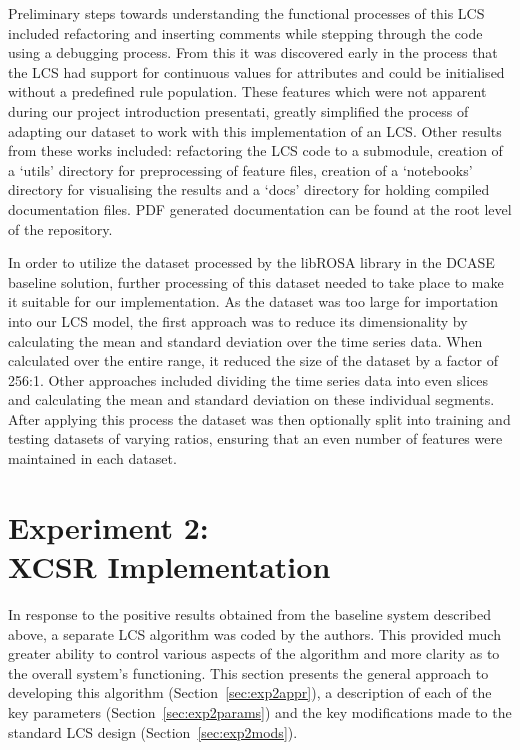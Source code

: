 \documentclass[11pt]{article}
\begin{document}
\begin{multicols}{2}
Preliminary steps towards understanding the functional processes of this LCS included refactoring and inserting comments while stepping through the code using a debugging process. From this it was discovered early in the process that the LCS had support for continuous values for attributes and could be initialised without a predefined rule population. These features which were not apparent during our project introduction presentati, greatly simplified the process of adapting our dataset to work with this implementation of an LCS. Other results from these works included: refactoring the LCS code to a submodule, creation of a ‘utils’ directory for preprocessing of feature files, creation of a ‘notebooks’ directory for visualising the results and a ‘docs’ directory for holding compiled documentation files. PDF generated documentation can be found at the root level of the repository.

In order to utilize the dataset processed by the libROSA library in the DCASE baseline solution, further processing of this dataset needed to take place to make it suitable for our implementation. As the dataset was too large for importation into our LCS model, the first approach was to reduce its dimensionality by calculating the mean and standard deviation over the time series data. When calculated over the entire range, it reduced the size of the dataset by a factor of 256:1. Other approaches included dividing the time series data into even slices and calculating the mean and standard deviation on these individual segments. After applying this process the dataset was then optionally split into training and testing datasets of varying ratios, ensuring that an even number of features were maintained in each dataset.






\section{Experiment 2:\\XCSR Implementation}
\label{sec:exp2}

In response to the positive results obtained from the baseline system described above, a separate LCS algorithm was coded by the authors. This provided much greater ability to control various aspects of the algorithm and more clarity as to the overall system's functioning. This section presents the general approach to developing this algorithm (Section~\ref{sec:exp2appr}), a description of each of the key parameters (Section~\ref{sec:exp2params}) and the key modifications made to the standard LCS design (Section~\ref{sec:exp2mods}).






\end{multicols}
\end{document}
